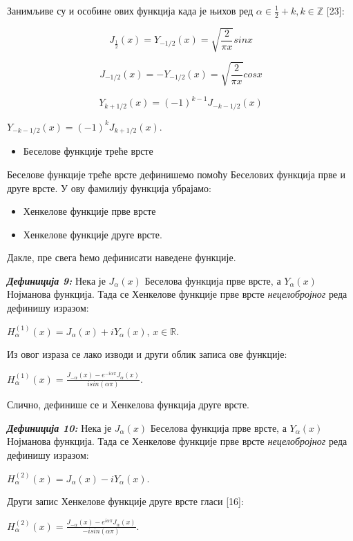 Занимљиве су и особине ових функција када је њихов ред
\(\alpha \in \frac{1}{2} + k,k\mathbb{\in Z}\) {[}23{]}:

\[J_{\frac{1}{2}}(x) = Y_{- 1/2}(x) = \sqrt{\frac{2}{\pi x}}sinx\]

\[J_{- 1/2}(x) = - Y_{- 1/2}(x) = \sqrt{\frac{2}{\pi x}}cosx\]

\[Y_{k + 1/2}(x) = {( - 1)}^{k - 1}J_{- k - 1/2}(x)\]

\(Y_{- k - 1/2}(x) = {( - 1)}^{k}J_{k + 1/2}(x)\).

\begin{itemize}
\item
  Беселове функције треће врсте
\end{itemize}

Беселове функције треће врсте дефинишемо помоћу Беселових функција прве
и друге врсте. У ову фамилију функција убрајамо:

\begin{itemize}
\item
  Хенкелове функције прве врсте
\item
  Хенкелове функције друге врсте.
\end{itemize}

Дакле, пре свега ћемо дефинисати наведене функције.

\emph{\textbf{Дефиниција 9:}} Нека је \(J_{\alpha}(x)\) Беселова
функција прве врсте, а \(Y_{\alpha}(x)\) Нојманова функција. Тада се
Хенкелове функције прве врсте \emph{нецелобројног} реда дефинишу
изразом:

\(H_{\alpha}^{(1)}(x) = J_{\alpha}(x) + iY_{\alpha}(x)\),
\(x\mathbb{\in R}\).

Из овог израза се лако изводи и други облик записа ове функције:

\(H_{\alpha}^{(1)}(x) = \frac{J_{- \alpha}(x) - e^{- i\alpha\pi}J_{\alpha}(x)}{isin(\alpha\pi)}\).

Слично, дефинише се и Хенкелова функција друге врсте.

\emph{\textbf{Дефиниција 10:}} Нека је \(J_{\alpha}(x)\) Беселова
функција прве врсте, а \(Y_{\alpha}(x)\) Нојманова функција. Тада се
Хенкелове функције прве врсте \emph{нецелобројног} реда дефинишу
изразом:

\(H_{\alpha}^{(2)}(x) = J_{\alpha}(x) - iY_{\alpha}(x)\).

Други запис Хенкелове функције друге врсте гласи {[}16{]}:

\(H_{\alpha}^{(2)}(x) = \frac{J_{- \alpha}(x) - e^{i\alpha\pi}J_{\alpha}(x)}{- isin(\alpha\pi)}\).

